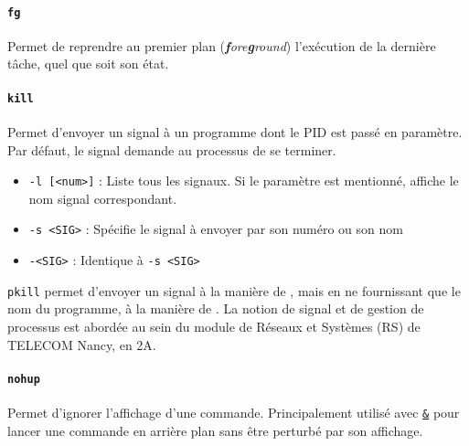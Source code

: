 \paragraph{\texttt{fg}} 
Permet de reprendre au premier plan (\textit{\textbf{f}ore\textbf{g}round}) l'exécution de la dernière tâche, quel que soit son état.



\paragraph{\texttt{kill}} 
Permet d'envoyer un signal à un programme dont le PID est passé en paramètre. Par défaut, le signal demande au processus de se terminer.
\begin{itemize}
    \item \texttt{-l [<num>]} : Liste tous les signaux. Si le paramètre est mentionné, affiche le nom signal correspondant.
    \item \texttt{-s <SIG>} : Spécifie le signal à envoyer par son numéro ou son nom
    \item \texttt{-<SIG>} : Identique à \texttt{-s <SIG>}
\end{itemize}

 \texttt{pkill} permet d'envoyer un signal à la manière de , mais en ne fournissant que le nom du programme, à la manière de . \newline
{} La notion de signal et de gestion de processus est abordée au sein du module de Réseaux et Systèmes (RS) de TELECOM Nancy, en 2A. 

\paragraph{\texttt{nohup}} 
Permet d'ignorer l'affichage d'une commande. Principalement utilisé avec \hyperref[cmd:fork]{\texttt{\&}} pour lancer une commande en arrière plan sans être perturbé par son affichage.
